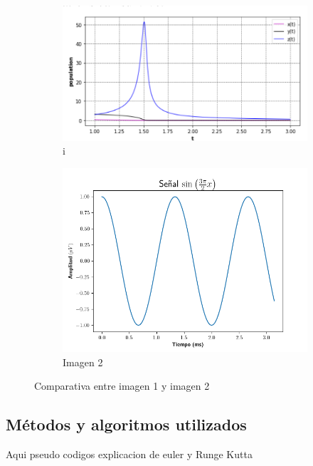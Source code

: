 \documentclass{wscpaperproc}
\theoremstyle{wsc}
\begin{document}
\begin{figure}[h]
	\centering
	\begin{subfigure}[b]{0.45\linewidth}
		\includegraphics[width=\linewidth]{Imagenes/Figure_1.png}
		\caption{i}
		\label{fig:imagen1}
	\end{subfigure}
	\hfill
	\begin{subfigure}[b]{0.45\linewidth}
		\includegraphics[width=\linewidth]{Imagenes/Figure_2.png}
		\caption{Imagen 2}
		\label{fig:imagen2}
	\end{subfigure}
	\caption{Comparativa entre imagen 1 y imagen 2}
	\label{fig:comparativa}
\end{figure}



\subsection{M\'etodos y algoritmos utilizados}
Aqui pseudo codigos explicacion de euler y Runge Kutta
\end{document}
